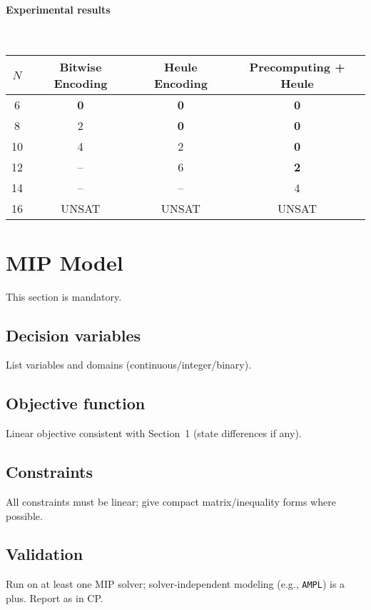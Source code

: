 \documentclass{article}
\begin{document}
\paragraph{Experimental results} \mbox{}\\

\begin{table}[h!]

\label{tab:results}
\begin{tabular}{c|c|c|c}
\hline
$N$ & Bitwise Encoding & Heule Encoding & Precomputing + Heule \\
\hline
6   & \textbf{0}  & \textbf{0}  & \textbf{0}  \\
8   & 2           & \textbf{0}  & \textbf{0}  \\
10  & 4           & 2           & \textbf{0}  \\
12  & --          & 6           & \textbf{2}  \\
14  & --          & --          & 4           \\
16  & UNSAT       & UNSAT       & UNSAT       \\
\hline
\end{tabular}
\end{table}






\section{MIP Model}
This section is mandatory.

\subsection{Decision variables}
List variables and domains (continuous/integer/binary).

\subsection{Objective function}
Linear objective consistent with Section~1 (state differences if any).

\subsection{Constraints}
All constraints must be linear; give compact matrix/inequality forms where possible.

\subsection{Validation}
Run on at least one MIP solver; solver-independent modeling (e.g., \texttt{AMPL}) is a plus.
Report as in CP.
\end{document}
